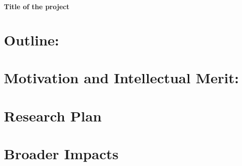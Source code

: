 \documentclass[11pt]{article} %
\begin{document}
\begin{center}
\large{\bf Title of the project}
\end{center}

\section*{Outline:}


\section*{Motivation and Intellectual Merit:}


\section*{Research Plan}


\section*{Broader Impacts}



\end{document}
